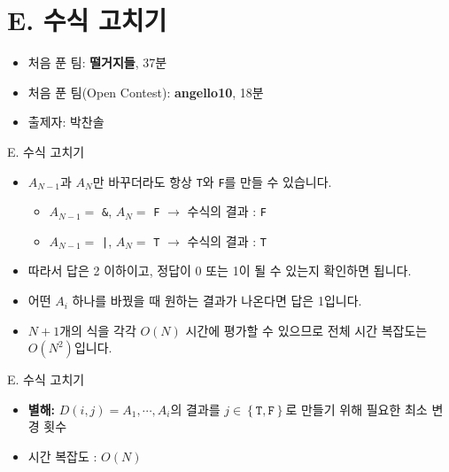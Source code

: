 \def\probno{E}
\def\probtitle{수식 고치기}

\section{\probno{}. \probtitle{}}

\begin{frame} %
    \sectiontitle{\probno{}}{\probtitle{}}
    \begin{itemize}
        \item 처음 푼 팀: \textbf{떨거지들}, 37분
        \item 처음 푼 팀(Open Contest): \textbf{angello10}, 18분
        \item 출제자: 박찬솔
    \end{itemize}
\end{frame}

\begin{frame}{\probno{}. \probtitle{}}
    \begin{itemize}
        \item $A_{N-1}$과 $A_N$만 바꾸더라도 항상 \texttt{T}와 \texttt{F}를 만들 수 있습니다.
        \begin{itemize}
            \item $A_{N-1}=$ \texttt{\&}, $A_N=$ \texttt{F} \quad $\rightarrow$ \quad 수식의 결과 : \texttt{F}
            \item $A_{N-1}=$ \texttt{|}, $A_N=$ \texttt{T} \quad $\rightarrow$ \quad 수식의 결과 : \texttt{T}
        \end{itemize}
        \item 따라서 답은 2 이하이고, 정답이 0 또는 1이 될 수 있는지 확인하면 됩니다.
        \item 어떤 $A_i$ 하나를 바꿨을 때 원하는 결과가 나온다면 답은 1입니다.
        \item $N+1$개의 식을 각각 $O(N)$ 시간에 평가할 수 있으므로 전체 시간 복잡도는 $O(N^2)$입니다.
    \end{itemize}
\end{frame}

\begin{frame}{\probno{}. \probtitle{}}
    \begin{itemize}
        \item \textbf{별해:} $D(i, j) = A_1, \cdots, A_i$의 결과를 $j \in \left\{\texttt{T}, \texttt{F}\right\}$로 만들기 위해 필요한 최소 변경 횟수
        \item 시간 복잡도 : $O(N)$
    \end{itemize}
\end{frame}
